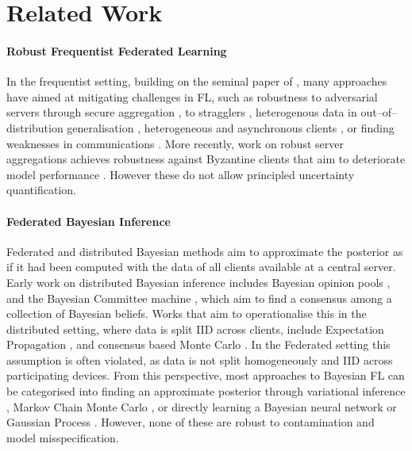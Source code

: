 \section{Related Work}
\paragraph{Robust Frequentist Federated Learning} In the frequentist setting, building on the seminal paper of \citet{mcmahan2017}, many approaches have aimed at mitigating challenges in FL, such as robustness to adversarial servers through secure aggregation \citep{chen2022}, to stragglers \citep{tziotis2023}, heterogenous data in out--of--distribution generalisation \citep{tenison2023}, heterogeneous and asynchronous clients \citep{fraboni2023}, or finding weaknesses in communications \citep{zhu2019, zhao2023}. 
More recently, %
work on robust server aggregations achieves robustness against Byzantine clients that aim to deteriorate model performance \citep{allouah2024, bao2024}. However these do not allow principled uncertainty quantification.

\paragraph{Federated Bayesian Inference}
Federated and distributed Bayesian methods aim to approximate the posterior as if it had been computed with the data of all clients available at a central server. 
Early work on distributed Bayesian inference includes Bayesian opinion pools \citep{genest1984, carvalho2023}, and the Bayesian Committee machine \citep{tresp2000}, which aim to find a consensus among a collection of Bayesian beliefs. 
Works that aim to operationalise this in the distributed setting, where data is split IID across clients, include Expectation Propagation \citep{minka2001b, opper2005, hasenclever2017, vehtari2020}, and consensus based Monte Carlo \citep{scott2016}.
In the Federated setting this assumption is often violated, as data is not split homogeneously and IID across participating devices. 
From this perspective, most approaches to Bayesian FL can be categorised into finding an approximate posterior through variational inference \citep{corinzia2021, ashman2022, kassab2022,heikillae2023, hassan2024, vedadi2024},  Markov Chain Monte Carlo \citep{al-shedivat2021,mekkaoui2021,kotelevskii2022, guo2023, hasan2024}, or directly learning a Bayesian neural network \citep{yurochkin2019, zhang2022} or Gaussian Process \citep{achituve2021}. However, none of these  are robust to contamination and model misspecification.



